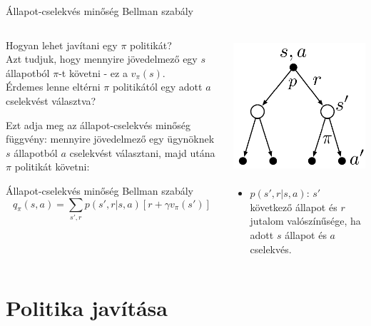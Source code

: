 \documentclass[english, aspectratio=169]{beamer}
\makeatletter
\let\origtableofcontents=\tableofcontents
\def\tableofcontents{\@ifnextchar[{\origtableofcontents}{\gobbletableofcontents}}
\def\gobbletableofcontents#1{\origtableofcontents}
\makeatother
\begin{document}
\begin{frame}{Állapot-cselekvés minőség Bellman szabály}
\begin{columns}
\begin{column}{.6\textwidth}
Hogyan lehet javítani egy $\pi$ politikát?\\
Azt tudjuk, hogy mennyire jövedelmező egy $s$ állapotból $\pi$-t követni - ez a $v_\pi(s)$.\\ Érdemes lenne eltérni $\pi$ politikától egy adott $a$ cselekvést választva?\par\smallskip
Ezt adja meg az állapot-cselekvés minőség függvény: mennyire jövedelmező egy ügynöknek $s$ állapotból $a$ cselekvést választani, majd utána $\pi$ politikát követni:\\
\begin{block}{Állapot-cselekvés minőség Bellman szabály}
\[
q_{\pi}(s,a)=\sum_{s',r}p\left(s',r|s,a\right)\left[r+\gamma v_{\pi}\left(s'\right)\right]
\]
\end{block}
\end{column}
\begin{column}{.45\textwidth}
\begin{center}
\includegraphics[width=5cm, height=5cm, keepaspectratio]{images/reinf_12.png}
\end{center}
\begin{itemize}
	\item $p\left(s',r|s,a\right)$: $s'$ következő állapot és $r$ jutalom valószínűsége, ha adott $s$ állapot és $a$ cselekvés.
\end{itemize}
\end{column}
\end{columns}
\end{frame}

\section{Politika javítása}

\begin{frame}
\tableofcontents[currentsection]
\end{frame}
\end{document}
